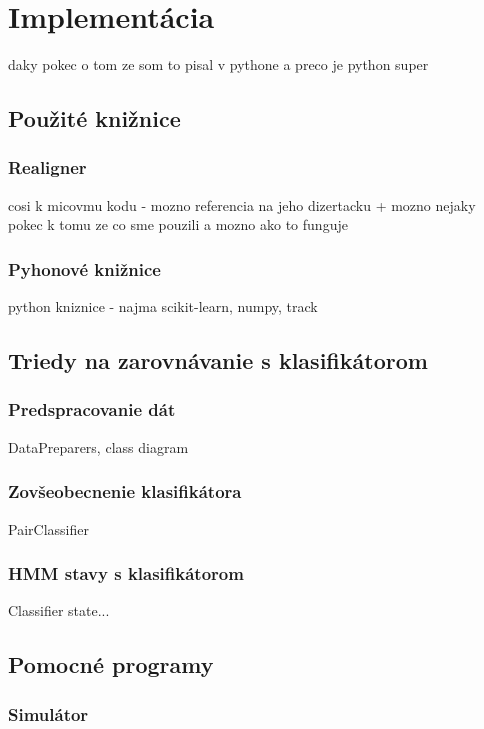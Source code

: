 \chapter{Implementácia}

\todo daky pokec o tom ze som to pisal v pythone a preco je python super

\section{Použité knižnice}

\subsection{Realigner}
\todo cosi k micovmu kodu - mozno referencia na jeho dizertacku + mozno nejaky pokec k tomu ze co sme pouzili a mozno ako to funguje

\subsection{Pyhonové knižnice}
\todo python kniznice - najma scikit-learn, numpy, track

\section{Triedy na zarovnávanie s klasifikátorom}

\subsection{Predspracovanie dát}

\todo DataPreparers, class diagram

\subsection{Zovšeobecnenie klasifikátora}

\todo PairClassifier

\subsection{HMM stavy s klasifikátorom}

\todo Classifier state...

\section{Pomocné programy}
\subsection{Simulátor}

